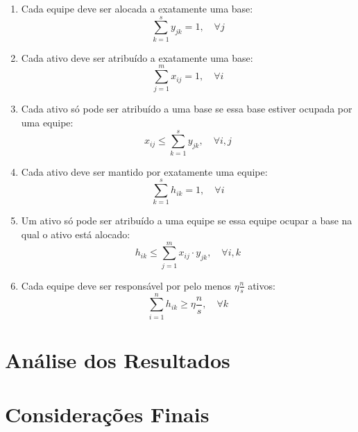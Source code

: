\documentclass[10pt]{article}
\begin{document}
\begin{enumerate}
    \item Cada equipe deve ser alocada a exatamente uma base:
    \[
    \sum_{k=1}^{s} y_{jk} = 1, \quad \forall j
    \]

    \item Cada ativo deve ser atribuído a exatamente uma base:
    \[
    \sum_{j=1}^{m} x_{ij} = 1, \quad \forall i
    \]

    \item Cada ativo só pode ser atribuído a uma base se essa base estiver ocupada por uma equipe:
    \[
    x_{ij} \leq \sum_{k=1}^{s} y_{jk}, \quad \forall i, j
    \]

    \item Cada ativo deve ser mantido por exatamente uma equipe:
    \[
    \sum_{k=1}^{s} h_{ik} = 1, \quad \forall i
    \]

    \item Um ativo só pode ser atribuído a uma equipe se essa equipe ocupar a base na qual o ativo está alocado:
    \[
    h_{ik} \leq \sum_{j=1}^{m} x_{ij} \cdot y_{jk}, \quad \forall i, k
    \]

    \item Cada equipe deve ser responsável por pelo menos $\eta \frac{n}{s}$ ativos:
    \[
    \sum_{i=1}^{n} h_{ik} \geq \eta \frac{n}{s}, \quad \forall k
    \]
\end{enumerate}

\section{Análise dos Resultados}



\section{Considerações Finais}
\end{document}
